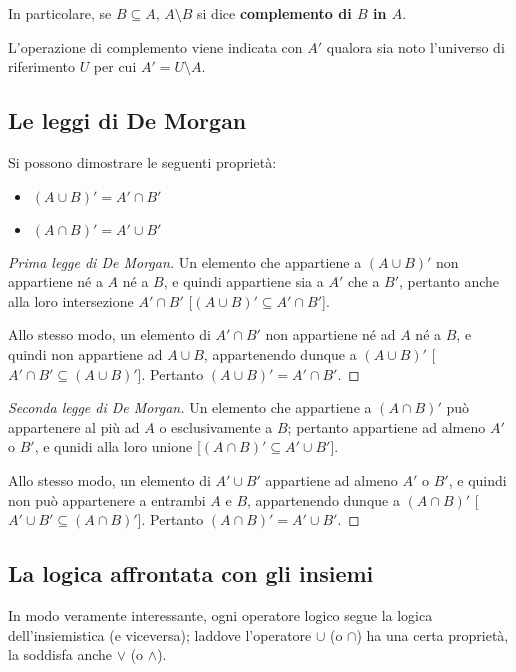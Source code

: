 In particolare, se $B \subseteq A$, $A \setminus B$ si dice \textbf{complemento di $B$ in $A$}.

L'operazione di complemento viene indicata con $A'$ qualora sia noto l'universo di riferimento $U$
per cui $A' = U \setminus A$.

\subsection{Le leggi di De Morgan}

Si possono dimostrare le seguenti proprietà:

\begin{itemize}
    \item $(A \cup B)' = A' \cap B'$
    \item $(A \cap B)' = A' \cup B'$
\end{itemize}

\begin{proof}[Prima legge di De Morgan]
    Un elemento che appartiene a $(A \cup B)'$ non appartiene né a $A$ né a $B$, e quindi
    appartiene sia a $A'$ che a $B'$, pertanto anche alla loro intersezione $A' \cap B'$
    [$(A \cup B)' \subseteq A' \cap B'$].

    Allo stesso modo, un elemento di $A' \cap B'$ non appartiene né ad $A$ né a $B$, e quindi
    non appartiene ad $A \cup B$, appartenendo dunque a $(A \cup B)'$
    [$A' \cap B' \subseteq (A \cup B)'$]. Pertanto $(A \cup B)' = A' \cap B'$.
\end{proof}

\begin{proof}[Seconda legge di De Morgan]
    Un elemento che appartiene a $(A \cap B)'$ può appartenere al più ad $A$ o esclusivamente
    a $B$; pertanto appartiene ad almeno $A'$ o $B'$, e qunidi alla loro unione
        [$(A \cap B)' \subseteq A' \cup B'$].

    Allo stesso modo, un elemento di $A' \cup B'$ appartiene ad almeno $A'$ o $B'$, e quindi
    non può appartenere a entrambi $A$ e $B$, appartenendo dunque a $(A \cap B)'$
    [$A' \cup B' \subseteq (A \cap B)'$]. Pertanto $(A \cap B)' = A' \cup B'$.
\end{proof}

\subsection{La logica affrontata con gli insiemi}

In modo veramente interessante, ogni operatore logico segue la logica
dell'insiemistica (e viceversa); laddove l'operatore $\cup$ (o $\cap$) ha una certa proprietà,
la soddisfa anche $\lor$ (o $\land$).

